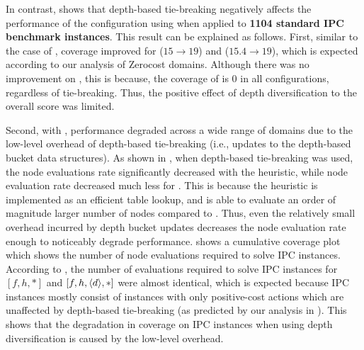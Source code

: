 In contrast,  shows that depth-based tie-breaking negatively affects the performance of
the configuration using \mands when applied to \textbf{1104 standard IPC benchmark instances}. This result can be explained as follows.
First,  similar to the case of \lmcut,  coverage improved for \fifo ($15\to 19$) and \ro ($15.4\to 19$), which is expected according to our analysis of Zerocost domains.
%
Although there was no improvement on , this is because, 
the coverage of  is 0 in all \mands configurations, regardless of tie-breaking. Thus, the positive
effect of depth diversification to the overall score was limited.


Second, with \mands, performance degraded across a wide range of domains due to the low-level overhead of depth-based tie-breaking (i.e., updates to the depth-based bucket data structures).
As shown in , when depth-based tie-breaking was used, the node evaluations rate significantly decreased with the \mands heuristic, 
while node evaluation rate decreased much less for \lmcut.
This is because  the \mands heuristic is implemented
as an efficient table lookup, and \mands is able to evaluate an order of magnitude larger number of nodes compared to \lmcut.
Thus, even the relatively small overhead incurred by depth bucket updates decreases the node evaluation rate enough to noticeably degrade \mands performance.
 shows a cumulative coverage plot which shows the number of node evaluations
required to solve IPC instances.
% 
According to , the number of evaluations required to solve IPC instances
for  $[f,h,*]$ and $[f,h,{\left<d\right>},*]$ were almost identical, which is expected because
IPC instances mostly consist of instances with only positive-cost actions which are unaffected by depth-based tie-breaking (as predicted by our analysis in ).
This shows that the degradation in coverage on IPC instances when using depth diversification is caused by the low-level overhead. %
% 

